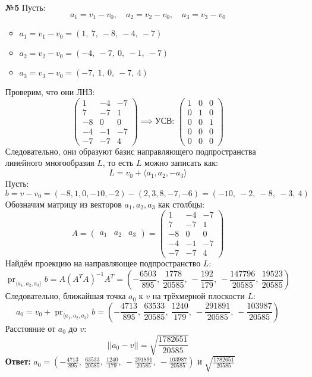 \documentclass[a4paper]{article}
\newcommand{\pr}{\operatorname{pr}}
\begin{document}
\begin{enumerate}
    \item[\textbf{№5}]Пусть:
    $$a_1 = v_1 - v_0, \quad a_2 = v_2 - v_0, \quad a_3 = v_3 - v_0$$
    \begin{itemize}
        \item \( a_1 = v_1 - v_0 = (1,\ 7,\ -8,\ -4,\ -7) \)
        \item \( a_2 = v_2 - v_0 = (-4,\ -7,\ 0,\ -1,\ -7) \)
        \item \( a_3 = v_3 - v_0 = (-7,\ 1,\ 0,\ -7,\ 4) \)
    \end{itemize}
    Проверим, что они ЛНЗ:
   $$ \begin{pmatrix}
        1 & -4 & -7 \\
        7 & -7 & 1 \\
        -8 & 0 & 0 \\
        -4 & -1 & -7 \\
        -7 & -7 & 4
        \end{pmatrix} \implies \text{УСВ: } \begin{pmatrix}
            1 & 0 & 0 \\
            0 & 1 & 0 \\
            0 & 0 & 1 \\
            0 & 0 & 0 \\
            0 & 0 & 0
            \end{pmatrix}$$
    Следовательно, они образуют базис направляющего подпространства линейного многообразия $L$, то есть $L$ можно записать как:
    $$L = v_0 + \langle a_1, a_2, -a_3 \rangle$$
    Пусть:
    $$b = v-v_0 =  (-8, 1, 0, -10, -2) - (2, 3, 8, -7, -6) = (-10,\ -2,\ -8,\ -3,\ 4)$$
    Обозначим матрицу из векторов \( a_1, a_2, a_3 \) как столбцы:
    \[
    A = \begin{pmatrix} a_1 & a_2 & a_3 \end{pmatrix} = \begin{pmatrix}
        1 & -4 & -7 \\
        7 & -7 & 1 \\
        -8 & 0 & 0 \\
        -4 & -1 & -7 \\
        -7 & -7 & 4
        \end{pmatrix}
    \]
    Найдём проекцию на направляющее подпространство $L$:
    $$\pr_{\langle a_1, a_2, a_3 \rangle} b = A(A^TA)^{-1}A^{T} = \left(
        - \frac{6503}{895},\ 
        \frac{1778}{20585},\ 
        - \frac{192}{179},\ 
        - \frac{147796}{20585},\ 
        \frac{19523}{20585}
        \right)$$
    Следовательно, ближайшая точка $a_0$ к $v$ на трёхмерной плоскости $L$:
    $$a_0 = v_0 + \pr_{\langle a_1, a_2, a_3 \rangle}b = \left(
        - \frac{4713}{895},\ 
        \frac{63533}{20585},\ 
        \frac{1240}{179},\ 
        - \frac{291891}{20585},\ 
        - \frac{103987}{20585}
        \right)$$
    Расстояние от $a_0$ до $v$:
    $$||a_0 - v|| = \sqrt{\frac{1782651}{20585}}$$
    \textbf{Ответ: } $a_0 = \left(
        - \frac{4713}{895},\ 
        \frac{63533}{20585},\ 
        \frac{1240}{179},\ 
        - \frac{291891}{20585},\ 
        - \frac{103987}{20585}
        \right)$
        и
    $ \sqrt{\frac{1782651}{20585}}$

\end{enumerate}
\end{document}
